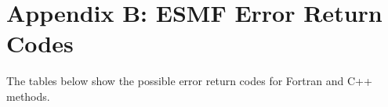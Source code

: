 %

\section{Appendix B:  ESMF Error Return Codes}

The tables below show the possible error return codes for Fortran and
C++ methods. 



